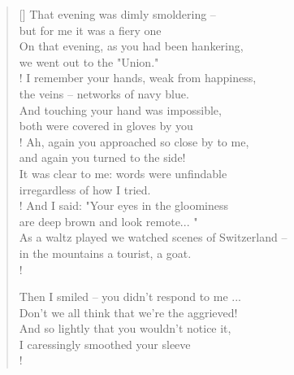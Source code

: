 \documentclass[]{article}
\newcommand{\poemauthorcenter}[1]{\nopagebreak{\centering\footnotesize\textsc{#1}\par}}
\begin{document}
\vspace*{0.15\textheight}
\settowidth{\versewidth}{That evening was dimly smoldering -- }
\begin{verse}[\versewidth]
That evening was dimly smoldering -- \\
but for me it was a fiery one\\
On that evening, as you had been hankering,\\
we went out to the "Union."\\!
I remember your hands, weak from happiness,\\
the veins -- networks of navy blue.\\
And touching your hand was impossible,\\
both were covered in gloves by you\\!
Ah, again you approached so close by to me,\\
and again you turned to the side!\\
It was clear to me: words were unfindable\\
irregardless of how I tried.\\!
And I said: "Your eyes in the gloominess\\
are deep brown and look remote... "\\
As a waltz played we watched scenes of Switzerland --\\
in the mountains a tourist, a goat.\\!

Then I smiled -- you didn't respond to me ... \\
Don't we all think that we're the aggrieved!\\
And so lightly that you wouldn't notice it,\\
I caressingly smoothed your sleeve\\!
\end{verse}
\poemauthorcenter{\textit{January 1915}}
\newpage
\end{document}
